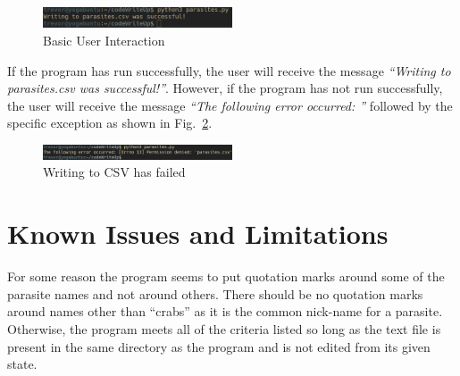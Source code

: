 \documentclass[journal,onecolumn]{IEEEtran}
\begin{document}
\begin{figure}[h]
	\centering
  	\includegraphics[width=0.5\textwidth]{img/success.png}
  	\caption{Basic User Interaction}	
  	\label{fig:success}
\end{figure}

If the program has run successfully, the user will receive the message \emph{``Writing to parasites.csv was successful!''}. However, if the program has not run successfully, the user
will receive the message \emph{``The following error occurred: ''} followed by the specific 
exception as shown in Fig.~\ref{fig:fail}. 

\begin{figure}[h]
	\centering
  	\includegraphics[width=0.5\textwidth]{img/fail.png}
  	\caption{Writing to CSV has failed}	
  	\label{fig:fail}
\end{figure}

\section{Known Issues and Limitations}
For some reason the program seems to put quotation marks around some of the parasite 
names and not around others. There should be no quotation marks around names other than ``crabs'' as it is the common nick-name for a parasite. Otherwise, the program meets all 
of the criteria listed so long as the text file is present in the same directory as the 
program and is not edited from its given state. 

\newpage

\appendices
\end{document}

